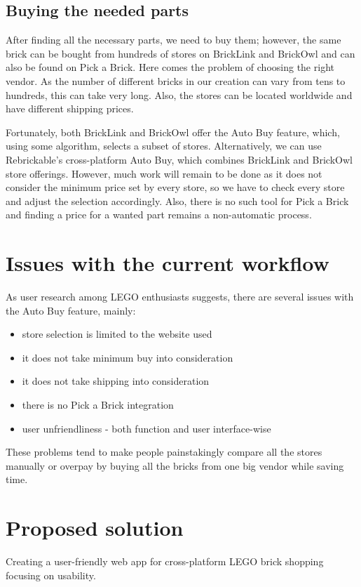 \subsection{Buying the needed parts}
After finding all the necessary parts, we need to buy them; however, the same brick can be bought from hundreds of stores on BrickLink and BrickOwl and can also be found on Pick a Brick. Here comes the problem of choosing the right vendor. As the number of different bricks in our creation can vary from tens to hundreds, this can take very long. Also, the stores can be located worldwide and have different shipping prices.

Fortunately, both BrickLink and BrickOwl offer the Auto Buy feature, which, using some algorithm, selects a subset of stores. Alternatively, we can use Rebrickable's cross-platform Auto Buy, which combines BrickLink and BrickOwl store offerings. However, much work will remain to be done as it does not consider the minimum price set by every store, so we have to check every store and adjust the selection accordingly. Also, there is no such tool for Pick a Brick and finding a price for a wanted part remains a non-automatic process.



\section{Issues with the current workflow}
\label{sec:problemsWorkflow}


As user research among LEGO enthusiasts suggests, there are several issues with the Auto Buy feature, mainly:

\begin{itemize}
    \item store selection is limited to the website used
    \item it does not take minimum buy into consideration
    \item it does not take shipping into consideration
    \item there is no Pick a Brick integration
    \item user unfriendliness - both function and user interface-wise
\end{itemize}

\noindent These problems tend to make people painstakingly compare all the stores manually or overpay by buying all the bricks from one big vendor while saving time.


\section{Proposed solution}
\label{sec:proposedSolution}

Creating a user-friendly web app for cross-platform LEGO brick shopping focusing on usability.


